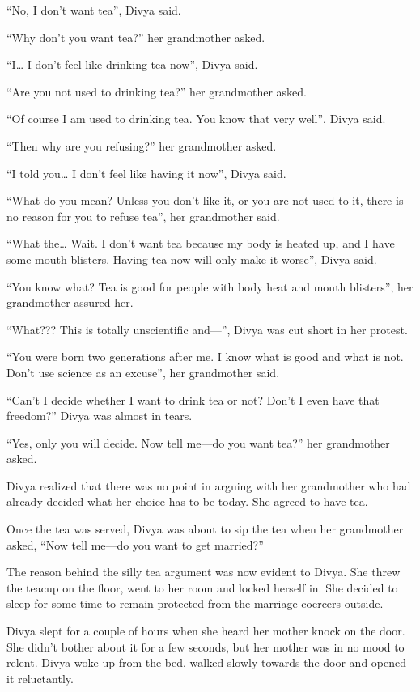 “No, I don't want tea”, Divya said.

“Why don't you want tea?” her grandmother asked.

“I… I don't feel like drinking tea now”, Divya said.

“Are you not used to drinking tea?” her grandmother asked.

“Of course I am used to drinking tea. You know that very well”, Divya said.

“Then why are you refusing?” her grandmother asked.

“I told you… I don't feel like having it now”, Divya said.

“What do you mean? Unless you don't like it, or you are not used to it, there is
no reason for you to refuse tea”, her grandmother said.

“What the… Wait. I don't want tea because my body is heated up, and I have
some mouth blisters. Having tea now will only make it worse”, Divya said.

“You know what? Tea is good for people with body heat and mouth blisters”, her
grandmother assured her.

“What??? This is totally unscientific and—”, Divya was cut short in her protest.

“You were born two generations after me. I know what is good and what is not.
Don't use science as an excuse”, her grandmother said.

“Can't I decide whether I want to drink tea or not? Don't I even have that
freedom?” Divya was almost in tears.

“Yes, only you will decide. Now tell me—do you want tea?” her grandmother
asked. 

Divya realized that there was no point in arguing with her grandmother who had
already decided what her choice has to be today. She agreed to have tea.

Once the tea was served, Divya was about to sip the tea when her
grandmother asked, “Now tell me—do you want to get married?”

The reason behind the silly tea argument was now evident to Divya. She threw the
teacup on the floor, went to her room and locked herself in. She decided to sleep
for some time to remain protected from the marriage coercers outside.

Divya slept for a couple of hours when she heard her mother knock on the
door. She didn't bother about it for a few seconds, but her mother was in no mood
to relent. Divya woke up from the bed, walked slowly towards the door and opened
it reluctantly.

